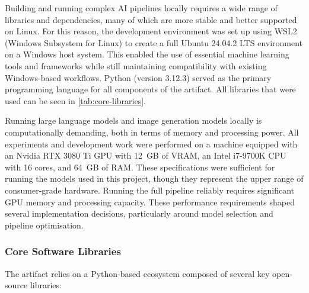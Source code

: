 Building and running complex AI pipelines locally requires a wide range of libraries and dependencies, many of which are more stable and better supported on Linux. For this reason, the development environment was set up using WSL2 (Windows Subsystem for Linux) to create a full Ubuntu 24.04.2 LTS environment on a Windows host system. This enabled the use of essential machine learning tools and frameworks while still maintaining compatibility with existing Windows-based workflows. Python (version 3.12.3) served as the primary programming language for all components of the artifact. All libraries that were used can be seen in \ref{tab:core-libraries}.

Running large language models and image generation models locally is computationally demanding, both in terms of memory and processing power. All experiments and development work were performed on a machine equipped with an Nvidia RTX 3080 Ti GPU with 12~GB of VRAM, an Intel i7-9700K CPU with 16 cores, and 64~GB of RAM. These specifications were sufficient for running the models used in this project, though they represent the upper range of consumer-grade hardware. Running the full pipeline reliably requires significant GPU memory and processing capacity. These performance requirements shaped several implementation decisions, particularly around model selection and pipeline optimisation.

\subsubsection*{Core Software Libraries}
The artifact relies on a Python-based ecosystem composed of several key open-source libraries:

